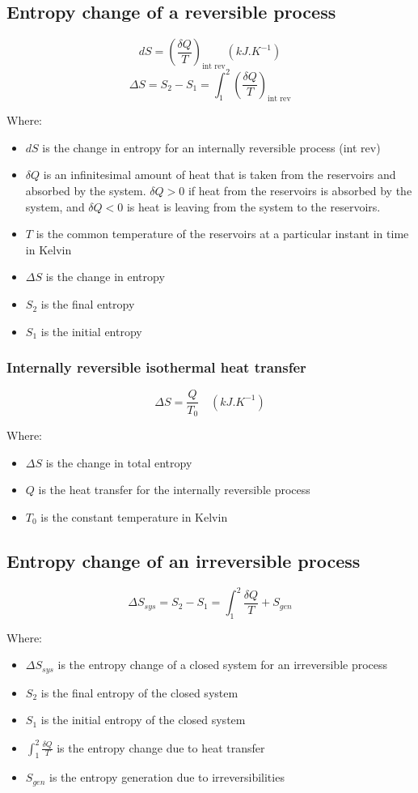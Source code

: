 \documentclass[11pt]{article}
\begin{document}
 \newpage
\subsection{Entropy change of a reversible process}
\label{sec:orgfb9bc32}
\[dS = \left( \frac{\delta Q}{T} \right)_{\text{int rev}} \left(\unit{kJ.K^{-1}} \right)\]
\[\Delta S = S_2 - S_1 = \int_1^2 \left(\frac{\delta Q}{T} \right)_{\text{int rev}}\]

Where:
\begin{itemize}
\item \(dS\) is the change in entropy for an internally reversible process (int rev)
\item \(\delta Q\) is an infinitesimal amount of heat that is taken from the reservoirs and absorbed by the system. \(\delta Q > 0\) if heat from the reservoirs is absorbed by the system, and \(\delta Q < 0\) is heat is leaving from the system to the reservoirs.
\item \(T\) is the common temperature of the reservoirs at a particular instant in time in Kelvin
\item \(\Delta S\) is the change in entropy
\item \(S_2\) is the final entropy
\item \(S_1\) is the initial entropy
\end{itemize}
\subsubsection{Internally reversible isothermal heat transfer}
\label{sec:orgee9e79c}
\[\Delta S = \frac{Q}{T_0} \quad (\unit{kJ.K^{-1}})\]

Where:
\begin{itemize}
\item \(\Delta S\) is the change in total entropy
\item \(Q\) is the heat transfer for the internally reversible process
\item \(T_0\) is the constant temperature in Kelvin
\end{itemize}

 \newpage
\subsection{Entropy change of an irreversible process}
\label{sec:org9c9dd57}
\[\Delta S_{sys} = S_2 - S_1 = \int_1^2 \frac{\delta Q}{T} + S_{gen}\]

Where:
\begin{itemize}
\item \(\Delta S_{sys}\) is the entropy change of a closed system for an irreversible process
\item \(S_2\) is the final entropy of the closed system
\item \(S_1\) is the initial entropy of the closed system
\item \(\int_1^2 \frac{\delta Q}{T}\) is the entropy change due to heat transfer
\item \(S_{gen}\) is the entropy generation due to irreversibilities
\end{itemize}
\end{document}

